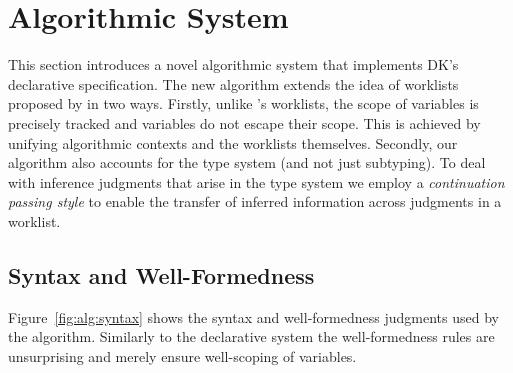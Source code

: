 \section{Algorithmic System}

This section introduces a novel algorithmic system that implements 
DK's declarative specification. The new algorithm extends the idea
of worklists proposed by \citet{itp2018} in two ways. Firstly,
unlike \citet{itp2018}'s worklists, the scope of variables is precisely tracked
and variables do not escape their scope. This is achieved by unifying algorithmic contexts and the worklists themselves.
Secondly, our algorithm also
accounts for the type system (and not just subtyping). To deal with
inference judgments that arise in the type system we employ a \emph{continuation
passing style} to enable the transfer of inferred information across
judgments in a worklist.

\subsection{Syntax and Well-Formedness}

Figure~\ref{fig:alg:syntax} shows the syntax and well-formedness
judgments used by the algorithm. Similarly to the declarative system 
the well-formedness rules are unsurprising and merely ensure 
well-scoping of variables.

